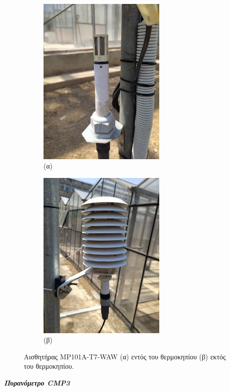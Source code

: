 \documentclass[12pt, a4paper]{report} %
\newcommand{\english}{\foreignlanguage{english}}
\begin{document}
\begin{figure}[ht]
    \centering
    \begin{subfigure}{0.5\textwidth}
        \centering
        \includegraphics[width=0.8\linewidth, height=83mm]{Figures/temp_meter_in.jpg}
        \caption*{(α)}{}
    \end{subfigure}%
    \begin{subfigure}{0.5\textwidth}
        \centering
        \includegraphics[width=0.8\linewidth, height=83mm]{Figures/temp_meter_out.jpg}
        \caption*{(β)}{}
    \end{subfigure}%
    \caption{Aισθητήρας \english{MP101A-T7-WAW} (α) εντός του θερμοκηπίου (β) εκτός του θερμοκηπίου.}
    \label{fig_temp_meter}
\end{figure}

\pagebreak

\noindent \textit{\textbf{Πυρανόμετρο \english{CMP3}}}

\vspace{0.2cm}
\end{document}
